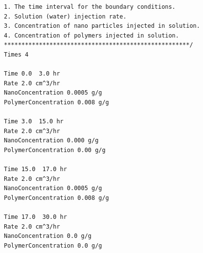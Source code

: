 \begin{appendices}
\begin{lstlisting}
1. The time interval for the boundary conditions.
2. Solution (water) injection rate.
3. Concentration of nano particles injected in solution.
4. Concentration of polymers injected in solution.
*****************************************************/
Times 4

Time 0.0  3.0 hr
Rate 2.0 cm^3/hr
NanoConcentration 0.0005 g/g
PolymerConcentration 0.008 g/g

Time 3.0  15.0 hr
Rate 2.0 cm^3/hr
NanoConcentration 0.000 g/g
PolymerConcentration 0.00 g/g

Time 15.0  17.0 hr
Rate 2.0 cm^3/hr
NanoConcentration 0.0005 g/g
PolymerConcentration 0.008 g/g

Time 17.0  30.0 hr
Rate 2.0 cm^3/hr
NanoConcentration 0.0 g/g
PolymerConcentration 0.0 g/g

\end{lstlisting}

\end{appendices}
\clearpage